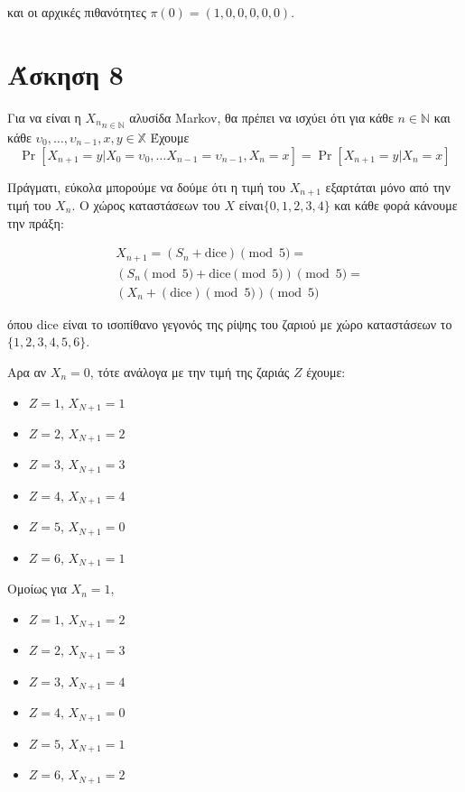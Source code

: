 \documentclass[11pt,a4paper]{article}
\newcommand{\english}[1]{\foreignlanguage{english}{{#1}}}
\begin{document}
και οι αρχικές πιθανότητες $π(0) = (1, 0, 0, 0, 0, 0)$.

\section*{Άσκηση 8}

Για να είναι η ${X_n}_{n \in \mathbb{N}}$ αλυσίδα \english{Markov}, θα πρέπει να ισχύει ότι για κάθε $n \in \mathbb{N}$ και κάθε $υ_0, \dots, υ_{n-1}, x, y \in \mathbb{X}$ Έχουμε
\begin{equation*}
    \Pr{[X_{n+1} = y | X_0 = υ_0, \dots X_{n-1} = υ_{n-1}, X_n = x]} = \Pr{[X_{n+1} = y | X_n = x]}
\end{equation*}

Πράγματι, εύκολα μπορούμε να δούμε ότι η τιμή του $X_{n+1}$ εξαρτάται μόνο από την τιμή του $X_n$. Ο χώρος καταστάσεων του $X$ είναι$\{0, 1, 2, 3, 4\}$ και κάθε φορά κάνουμε την πράξη:
\begin{otherlanguage}{english}
    \begin{align*}
         & X_{n+1}  = (S_{n} + \text{dice})\pmod 5 =      \\
         & (S_{n}\pmod 5 + \text{dice} \pmod 5) \pmod 5 = \\
         & (X_n + (\text{dice}) \pmod 5) \pmod 5
    \end{align*}
\end{otherlanguage}


όπου \english{dice} είναι το ισοπίθανο γεγονός της ρίψης του ζαριού με χώρο καταστάσεων το $\{1, 2, 3, 4, 5, 6\}$.

Αρα αν $X_n = 0$, τότε ανάλογα με την τιμή της ζαριάς $Z$ έχουμε:
\begin{itemize}
    \item $Z=1$, $X_{N+1} = 1$
    \item $Z=2$, $X_{N+1} = 2$
    \item $Z=3$, $X_{N+1} = 3$
    \item $Z=4$, $X_{N+1} = 4$
    \item $Z=5$, $X_{N+1} = 0$
    \item $Z=6$, $X_{N+1} = 1$
\end{itemize}

Ομοίως για $X_n = 1$,
\begin{itemize}
    \item $Z=1$, $X_{N+1} = 2$
    \item $Z=2$, $X_{N+1} = 3$
    \item $Z=3$, $X_{N+1} = 4$
    \item $Z=4$, $X_{N+1} = 0$
    \item $Z=5$, $X_{N+1} = 1$
    \item $Z=6$, $X_{N+1} = 2$
\end{itemize}
\end{document}
